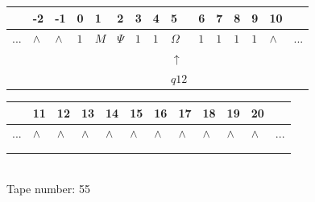 \documentclass[11pt]{article}
\begin{document}
\begin{table}[H]
\centering
\begin{tabular}{lllllllllllllll}
 & -2 & -1 & 0 & 1 & 2 & 3 & 4 & 5 & 6 & 7 & 8 & 9 & 10 & \\
\hline
$...$ & \multicolumn{1}{|l|}{$\wedge$} & \multicolumn{1}{|l|}{$\wedge$} & \multicolumn{1}{|l|}{$1$} & \multicolumn{1}{|l|}{$M$} & \multicolumn{1}{|l|}{$\Psi$} & \multicolumn{1}{|l|}{$1$} & \multicolumn{1}{|l|}{$1$} & \multicolumn{1}{|l|}{$\Omega$} & \multicolumn{1}{|l|}{$1$} & \multicolumn{1}{|l|}{$1$} & \multicolumn{1}{|l|}{$1$} & \multicolumn{1}{|l|}{$1$} & \multicolumn{1}{|l|}{$\wedge$} & $...$\\
\hline
&  &  &  &  &  &  &  & $\uparrow$ &  &  &  &  &  &  \\
&  &  &  &  &  &  &  & $ q12 $ &  &  &  &  &  &  \\
\end{tabular}
\begin{tabular}{llllllllllll}
 & 11 & 12 & 13 & 14 & 15 & 16 & 17 & 18 & 19 & 20 & \\
\hline
$...$ & \multicolumn{1}{|l|}{$\wedge$} & \multicolumn{1}{|l|}{$\wedge$} & \multicolumn{1}{|l|}{$\wedge$} & \multicolumn{1}{|l|}{$\wedge$} & \multicolumn{1}{|l|}{$\wedge$} & \multicolumn{1}{|l|}{$\wedge$} & \multicolumn{1}{|l|}{$\wedge$} & \multicolumn{1}{|l|}{$\wedge$} & \multicolumn{1}{|l|}{$\wedge$} & \multicolumn{1}{|l|}{$\wedge$} & $...$\\
\hline
&  &  &  &  &  &  &  &  &  &  &  \\
&  &  &  &  &  &  &  &  &  &  &  \\
\end{tabular}
\\
Tape number: 55
\noindent\makebox[\linewidth]{\hdashrule{\textwidth}{1pt}{1pt}}\end{table}
\clearpage
\end{document}

